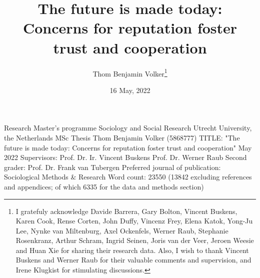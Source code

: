 \documentclass[
  11pt,
]{article}
\title{The future is made today: Concerns for reputation foster trust and cooperation}
\author{Thom Benjamin Volker\footnote{I gratefuly acknowledge Davide Barrera, Gary Bolton, Vincent Buskens, Karen Cook, Rense Corten, John Duffy, Vincenz Frey, Elena Katok, Yong-Ju Lee, Nynke van Miltenburg, Axel Ockenfels, Werner Raub, Stephanie Rosenkranz, Arthur Schram, Ingrid Seinen, Joris van der Veer, Jeroen Weesie and Huan Xie for sharing their research data. Also, I wish to thank Vincent Buskens and Werner Raub for their valuable comments and supervision, and Irene Klugkist for stimulating discussions.}}
\date{16 May, 2022}
\let\oldmaketitle\maketitle
\begin{document}
\maketitle


\thispagestyle{empty}
\begin{large}
\noindent Research Master's programme 
Sociology and Social Research \newline
Utrecht University, the Netherlands \newline
\newline
\newline
\newline
\newline
MSc Thesis Thom Benjamin Volker (5868777) 
\newline
TITLE: "The future is made today: Concerns for reputation foster trust and cooperation" 
\newline
May 2022 
\newline
\newline
\newline
\newline
\newline
Supervisors:\newline
Prof. Dr. Ir. Vincent Buskens \newline
Prof. Dr. Werner Raub
\newline
\newline
Second grader: \newline
Prof. Dr. Frank van Tubergen
\newline
\newline
\newline
\newline
Preferred journal of publication: Sociological Methods \& Research
\newline
Word count: 23550 (13842 excluding references and appendices; of which 6335 for the data and methods section)
\newline
\addtocounter{page}{-1}
\end{large}
\pagebreak

\let\maketitle\oldmaketitle
\maketitle
\end{document}

